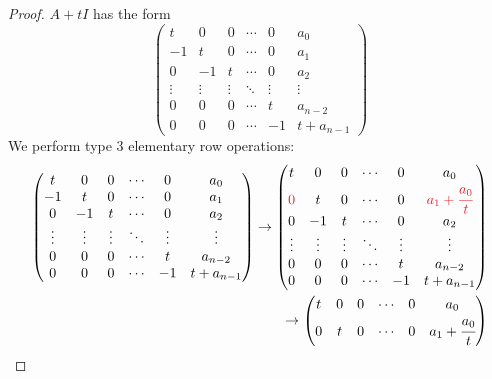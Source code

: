 \begin{proof}
\(A + tI\) has the form
\[
    \begin{pmatrix}
        t      & 0      & 0      & \cdots & 0      & a_{0} \\
        -1     & t      & 0      & \cdots & 0      & a_{1} \\
        0      & -1     & t      & \cdots & 0      & a_{2} \\
        \vdots & \vdots & \vdots & \ddots & \vdots & \vdots \\
        0      & 0      & 0      & \cdots & t      & a_{n-2} \\
        0      & 0      & 0      & \cdots & -1     & t + a_{n-1}
    \end{pmatrix}
\]
We perform type 3 elementary row operations:
\begin{align*}
    \begin{pmatrix}
        t      & 0      & 0      & \cdots & 0      & a_{0} \\
        -1     & t      & 0      & \cdots & 0      & a_{1} \\
        0      & -1     & t      & \cdots & 0      & a_{2} \\
        \vdots & \vdots & \vdots & \ddots & \vdots & \vdots \\
        0      & 0      & 0      & \cdots & t      & a_{n-2} \\
        0      & 0      & 0      & \cdots & -1     & t + a_{n-1}  
    \end{pmatrix}
    \to
    \begin{pmatrix}
        t       & 0      & 0      & \cdots & 0      & a_{0} \\
        \RED{0} & t      & 0      & \cdots & 0      & \RED{a_{1} + \cfrac{a_0}{t}} \\
        0       & -1     & t      & \cdots & 0      & a_{2} \\
        \vdots  & \vdots & \vdots & \ddots & \vdots & \vdots \\
        0      & 0      & 0      & \cdots & t      & a_{n-2} \\
        0       & 0      & 0      & \cdots & -1     & t + a_{n-1}  
    \end{pmatrix} \\
    \to
    \begin{pmatrix}
        t       & 0       & 0      & \cdots & 0      & a_{0} \\
        0       & t       & 0      & \cdots & 0      & a_{1} + \cfrac{a_0}{t} \\

\end{pmatrix}
\end{align*}
\end{proof}
